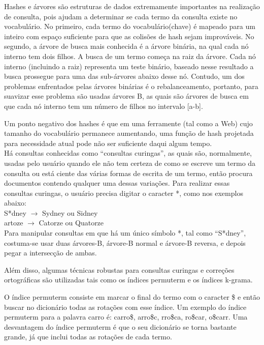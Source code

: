   Hashes e árvores são estruturas de dados extremamente importantes na realização de consulta, pois ajudam a determinar se cada termo da consulta existe no vocabulário. No primeiro, cada termo do vocabulário(chave) é mapeado para um inteiro com espaço suficiente para que as colisões de hash sejam improváveis. No segundo, a árvore de busca mais conhecida é a árvore binária, na qual cada nó interno tem dois filhos. A busca de um termo começa na raiz da árvore. Cada nó interno (incluindo a raiz) representa um teste binário, baseado nesse resultado a busca prossegue para uma das sub-árvores abaixo desse nó. Contudo, um dos problemas enfrentados pelas árvores binárias é o rebalanceamento, portanto, para suavizar esse problema são usadas árvores B, as quais são árvores de busca em que cada nó interno tem um número de filhos no intervalo [a-b].
   
  Um ponto negativo dos hashes é que em uma ferramente (tal como a Web) cujo tamanho do vocabulário permanece aumentando, uma função de hash projetada para necessidade atual pode não ser suficiente daqui algum tempo. \\
  
  Há consultas conhecidas como “consultas curingas”, as quais são, normalmente, usadas pelo usuário quando ele não tem certeza de como se escreve um termo da consulta ou está ciente das várias formas de escrita de um termo, então procura documentos contendo qualquer uma dessas variações. Para realizar essas consultas curingas, o usuário precisa digitar o caracter *, como nos exemplos abaixo: \\
    
\indent S*dney $\rightarrow$ Sydney ou Sidney \\
\indent *artoze $\rightarrow$ Catorze ou Quatorze \\

  Para manipular consultas em que há um único símbolo *, tal como “S*dney”, costuma-se usar duas árvores-B, árvore-B normal e árvore-B reversa, e depois pegar a intersecção de ambas.    

  Além disso, algumas técnicas robustas para consultas curingas e correções ortográficas são utilizadas tais como os índices permuterm e os índices k-grama. 
    
  O índice permuterm consiste em marcar o final do termo com o caracter \$ e então buscar no dicionário todas as rotações com esse índice. Um exemplo do índice permuterm para a palavra carro é:  carro\$, arro\$c, rro\$ca, ro\$car, o\$carr. Uma desvantagem do índice permuterm é que o seu dicionário se torna bastante grande, já que inclui todas as rotações de cada termo. 
    
